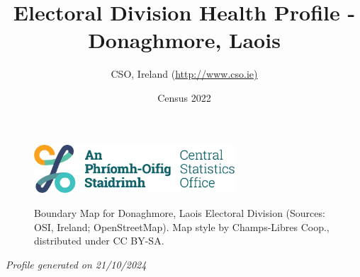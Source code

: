 \documentclass{article}
\title{Electoral Division Health Profile - Donaghmore, Laois}
\date{Census 2022}
\author{CSO, Ireland  (\url{http://www.cso.ie)}}
\begin{document}


\begin{figure}
	\centering
\includegraphics[width =75mm]{../figures/CSO_Logo.png}
\end{figure}

\begin{figure}[h]
	\centering
	\setlength{\fboxsep}{1pt}
	\caption{\normalsize Boundary Map for Donaghmore, Laois Electoral Division (Sources: OSI, Ireland; OpenStreetMap). Map style by Champs-Libres Coop., distributed under CC BY-SA.}
	\label{fig:2ae19629-1a6a-13a3-e055-000000000001}
	\end{figure}
	{\let\newpage\relax\maketitle}
	     \begin{center}
         \emph{Profile generated on 21/10/2024}
     \end{center}
\end{document}
